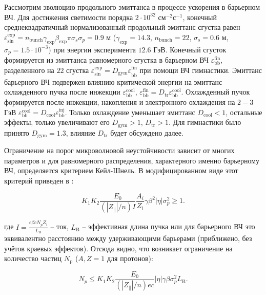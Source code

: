 \par Рассмотрим эволюцию продольного эмиттанса в процессе ускорения в барьерном ВЧ. 
Для достижения светимости порядка $2 \cdot 10^{32}$ см$^{-2}$с$^{-1}$, конечный среднеквадратичный нормализованный продольный эмиттанс сгустка равен $\varepsilon_{\textrm{sin}}^{\textrm{exp}}=n_{\textrm{bunch}}\gamma_{\textrm{exp}}\beta_{\textrm{exp}}\pi\sigma_s\sigma_p=0.9$ м ($\gamma_{\textrm{exp}}=14.3$, $n_{\textrm{bunch}}=22$, $\sigma_s=0.6$ м, $\sigma_p=1.5\cdot 10^{-3}$) при энергии эксперимента $12.6$ ГэВ. 
Конечный сгусток формируется из эмиттанса равномерного сгустка в барьерном ВЧ $\varepsilon_{\textrm{bb}}^{\textrm{fin}}$, разделенного на $22$ сгустка $\varepsilon_{\textrm{sin}}^{\textrm{exp}}={D_{\textrm{gym}}\varepsilon}_{\textrm{bb}}^{\textrm{fin}}$ при помощи ВЧ гимнастики. 
Эмиттанс барьерного ВЧ подвержен влиянию критической энергии на эмиттанс охлажденного пучка после инжекции $\varepsilon_{\textrm{bb}}^{\textrm{cool}}$, $\varepsilon_{\textrm{bb}}^{\textrm{fin}}=D_{\textrm{tr}}\varepsilon_{\textrm{bb}}^{\textrm{cool}}$. 
Охлажденный пучок формируется после инжекции, накопления и электронного охлаждения на $2-3$ ГэВ $ \varepsilon_{\textrm{bb}}^{\textrm{cool}}=D_{\textrm{cool}}\varepsilon_{\textrm{bb}}^{\textrm{inj}}$. 
Только охлаждение уменьшает эмиттанс $D_{\textrm{cool}}<1$, остальные эффекты, только увеличивают его $D_{\textrm{gym}}>1$, $D_{\textrm{tr}}>1$. 
Для гимнастики было принято $D_{\textrm{gym}}=1.3$, влияние $D_{\textrm{tr}}$ будет обсуждено далее.
	
\par Ограничение на порог микроволновой неустойчивости зависит от многих параметров и для равномерного распределения, характерного именно барьерному ВЧ, определяется критерием Кейл-Шнель. В модифицированном виде этот критерий приведен в \cite{zinkevich}:

\begin{equation}
K_1K_2\frac{E_0}{\left(\left|Z_\parallel\right|/n\right)I}\frac{A_i}{Z_i}\gamma\beta^2|\eta|\sigma_p^2\geq1.
\label{eq:microwave_instability}
\end{equation}

\noindent где $I=\frac{{e\beta cN}_pZ_i}{L_{\textrm{B}}}$ -- ток, $L_{\textrm{B}}$ -- эффективная длина пучка или для барьерного ВЧ это эквивалентно расстоянию между удерживающими барьерами (приближено, без учётов краевых эффектов). Отсюда видно, что возникает ограничение на количество частиц $N_{\textrm{p}}$ ($A, Z=1$ для протонов):

\begin{equation}
N_p\le K_1K_2\frac{E_0}{\left(\left|Z_\parallel\right|/n\right)ec}\left|\eta\right|\gamma\beta\sigma_p^2L_{\textrm{B}}.
\label{eq:microwave_instability_1}
\end{equation}

